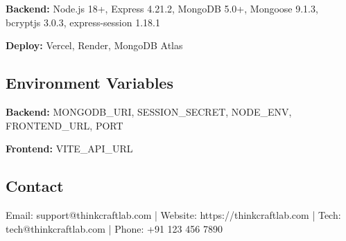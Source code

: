 ﻿\documentclass[11pt]{article}
\begin{document}
\textbf{Backend:} Node.js 18+, Express 4.21.2, MongoDB 5.0+, Mongoose 9.1.3, bcryptjs 3.0.3, express-session 1.18.1

\textbf{Deploy:} Vercel, Render, MongoDB Atlas

\subsection{Environment Variables}
\textbf{Backend:} MONGODB\_URI, SESSION\_SECRET, NODE\_ENV, FRONTEND\_URL, PORT

\textbf{Frontend:} VITE\_API\_URL

\subsection{Contact}
Email: support@thinkcraftlab.com | Website: https://thinkcraftlab.com | Tech: tech@thinkcraftlab.com | Phone: +91 123 456 7890
\end{document}
